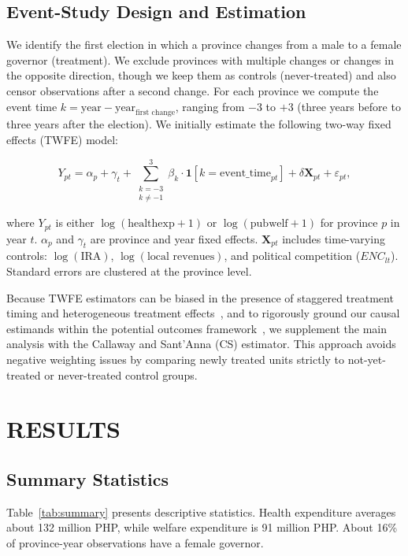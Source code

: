 \documentclass[conference]{IEEEtran}
\begin{document}
\subsection{Event-Study Design and Estimation}
We identify the first election in which a province changes from a male to a female governor (treatment). We exclude provinces with multiple changes or changes in the opposite direction, though we keep them as controls (never-treated) and also censor observations after a second change. For each province we compute the event time $k = \text{year} - \text{year}_{\text{first change}}$, ranging from $-3$ to $+3$ (three years before to three years after the election). We initially estimate the following two-way fixed effects (TWFE) model:

\[
Y_{pt} = \alpha_p + \gamma_t + \sum_{\substack{k=-3 \\ k \neq -1}}^{3} \beta_k \cdot \mathbf{1}[k = \text{event\_time}_{pt}] + \delta \mathbf{X}_{pt} + \varepsilon_{pt},
\]

where $Y_{pt}$ is either $\log(\text{healthexp}+1)$ or $\log(\text{pubwelf}+1)$ for province $p$ in year $t$. $\alpha_p$ and $\gamma_t$ are province and year fixed effects. $\mathbf{X}_{pt}$ includes time-varying controls: $\log(\text{IRA})$, $\log(\text{local revenues})$, and political competition ($ENC_{lt}$). Standard errors are clustered at the province level.

Because TWFE estimators can be biased in the presence of staggered treatment timing and heterogeneous treatment effects~\cite{callaway2021difference}, and to rigorously ground our causal estimands within the potential outcomes framework~\cite{imbens2015causal}, we supplement the main analysis with the Callaway and Sant'Anna (CS) estimator. This approach avoids negative weighting issues by comparing newly treated units strictly to not-yet-treated or never-treated control groups.

\section{RESULTS}

\subsection{Summary Statistics}
Table~\ref{tab:summary} presents descriptive statistics. Health expenditure averages about 132 million PHP, while welfare expenditure is 91 million PHP. About 16\% of province-year observations have a female governor. 
\end{document}
